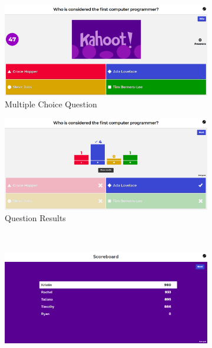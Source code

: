 \documentclass{article}
\begin{document}
\begin{figure}
    \centering
    \begin{subfigure}[b]{0.49\textwidth}
        \includegraphics[width=\textwidth]{images/kahoot-question.png}
        \caption{Multiple Choice Question}
        \label{fig:kahoot-question}
    \end{subfigure}
    \begin{subfigure}[b]{0.49\textwidth}
        \includegraphics[width=\textwidth]{images/kahoot-post_question.png}
        \caption{Question Results}
        \label{fig:kahoot-post_question}
    \end{subfigure}
    \\
    \begin{subfigure}[b]{0.49\textwidth}
        \includegraphics[width=\textwidth]{images/kahoot-scoreboard.png}

\end{subfigure}
\end{figure}
\end{document}
